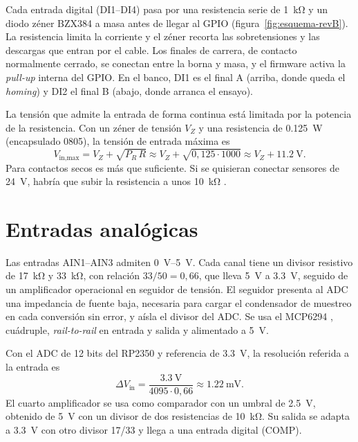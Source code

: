 Cada entrada digital (DI1--DI4) pasa por una resistencia serie de \SI{1}{\kilo\ohm} y un diodo zéner
BZX384 a masa \cite{bzx384} antes de llegar al GPIO (figura~\ref{fig:esquema-revB}). La resistencia
limita la corriente y el zéner recorta las sobretensiones y las descargas que entran por el cable.
Los finales de carrera, de contacto normalmente cerrado, se conectan entre la borna y masa, y el
firmware activa la \emph{pull-up} interna del GPIO. En el banco, DI1 es el final A (arriba, donde
queda el \emph{homing}) y DI2 el final B (abajo, donde arranca el ensayo).

La tensión que admite la entrada de forma continua está limitada por la potencia de la resistencia.
Con un zéner de tensión $V_Z$ y una resistencia de \SI{0.125}{\watt} (encapsulado 0805), la tensión
de entrada máxima es
\begin{equation}
  V_{\text{in,max}} = V_Z + \sqrt{P_R\,R} \approx V_Z + \sqrt{0{,}125 \cdot 1000} \approx V_Z + \SI{11.2}{\volt}.
\end{equation}
Para contactos secos es más que suficiente. Si se quisieran conectar sensores de \SI{24}{\volt},
habría que subir la resistencia a unos \SI{10}{\kilo\ohm}
.

\section{Entradas analógicas}

Las entradas AIN1--AIN3 admiten \SIrange{0}{5}{\volt}. Cada canal tiene un divisor resistivo de
\SI{17}{\kilo\ohm} y \SI{33}{\kilo\ohm}, con relación $33/50 = 0{,}66$, que lleva \SI{5}{\volt} a
\SI{3.3}{\volt}, seguido de un amplificador operacional en seguidor de tensión. El seguidor presenta
al ADC una impedancia de fuente baja, necesaria para cargar el condensador de muestreo en cada
conversión sin error, y aísla el divisor del ADC. Se usa el MCP6294 \cite{mcp629x}, cuádruple,
\emph{rail-to-rail} en entrada y salida y alimentado a \SI{5}{\volt}.

Con el ADC de 12 bits del RP2350 y referencia de \SI{3.3}{\volt}, la resolución referida a la
entrada es
\begin{equation}
  \Delta V_{\text{in}} = \frac{\SI{3.3}{\volt}}{4095 \cdot 0{,}66} \approx \SI{1.22}{\milli\volt}.
\end{equation}
El cuarto amplificador se usa como comparador con un umbral de \SI{2.5}{\volt}, obtenido de
\SI{5}{\volt} con un divisor de dos resistencias de \SI{10}{\kilo\ohm}. Su salida se adapta a
\SI{3.3}{\volt} con otro divisor 17/33 y llega a una entrada digital (COMP).

